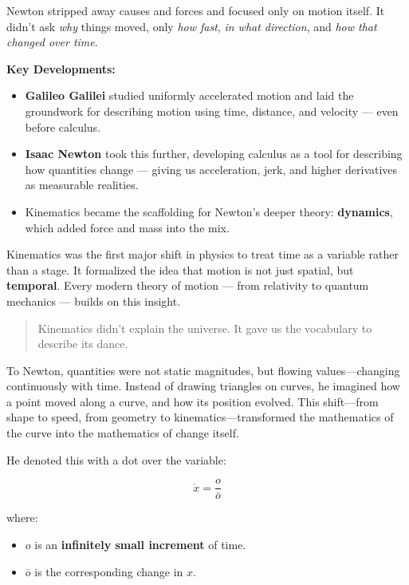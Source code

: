     \medskip
    
    Newton stripped away causes and forces and focused only on motion itself. It didn’t ask \textit{why} things moved, only \textit{how fast}, \textit{in what direction}, and \textit{how that changed over time}.

    \textbf{Key Developments:}
    

    \begin{itemize}
      \item \textbf{Galileo Galilei} studied uniformly accelerated motion and laid the groundwork for describing motion using time, distance, and velocity — even before calculus.
      \item \textbf{Isaac Newton} took this further, developing calculus as a tool for describing how quantities change — giving us acceleration, jerk, and higher derivatives as measurable realities.
      \item Kinematics became the scaffolding for Newton’s deeper theory: \textbf{dynamics}, which added force and mass into the mix.
    \end{itemize}
    
    Kinematics was the first major shift in physics to treat time as a variable rather than a stage. It formalized the idea that motion is not just spatial, but \textbf{temporal}. Every modern theory of motion — from relativity to quantum mechanics — builds on this insight.
    
    \begin{quote}
    Kinematics didn’t explain the universe.  It gave us the vocabulary to describe its dance.
    \end{quote}

To Newton, quantities were not static magnitudes, but flowing values—changing continuously with time. Instead of drawing triangles on curves, he imagined how a point moved along a curve, and how its position evolved. This shift—from shape to speed, from geometry to kinematics—transformed the mathematics of the curve into the mathematics of change itself.

He denoted this with a dot over the variable:

\[
\dot{x} = \frac{o}{\bar{o}}
\]

where:

\begin{itemize}
    \item \( o \) is an \textbf{infinitely small increment} of time.  
    \item \( \bar{o} \) is the corresponding change in \( x \).
\end{itemize}


